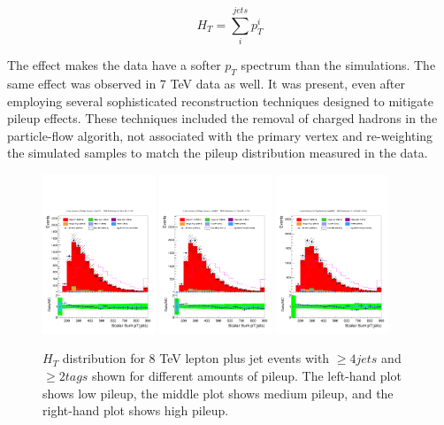 \begin{equation}
H_{T} = \sum_{i}^{jets} p_{T}^{i}
\end{equation}

\noindent The effect makes the data have a softer $p_{T}$ spectrum
than the simulations.  The same effect was observed in 7 TeV data
as well.  It was present, even after employing several sophisticated
reconstruction techniques designed to mitigate pileup effects.  These
techniques included the removal of charged hadrons in the
particle-flow algorith, not associated with the primary vertex and
re-weighting the simulated samples to match the pileup distribution
measured in the data.  

\begin{figure}[hbtp]
 \begin{center}
   \includegraphics[width=0.30\textwidth]{Figures/Analysis_1_Diagrams/d2MCPlots_Ht_cut10_4J_2T_lowNPV_Combined.pdf}
   \includegraphics[width=0.30\textwidth]{Figures/Analysis_1_Diagrams/d2MCPlots_Ht_cut11_4J_2T_midNPV_Combined.pdf}
   \includegraphics[width=0.30\textwidth]{Figures/Analysis_1_Diagrams/d2MCPlots_Ht_cut12_4J_2T_highNPV_Combined.pdf}
   \caption{$H_{T}$ distribution for 8 TeV lepton plus jet events with $\geq 4 jets$ and $\geq 2 tags$ shown
   for different amounts of pileup. The left-hand plot shows low pileup, the middle plot shows
   medium pileup, and the right-hand plot shows high pileup.}
   \label{fig:HTreweight}
 \end{center}
\end{figure}



